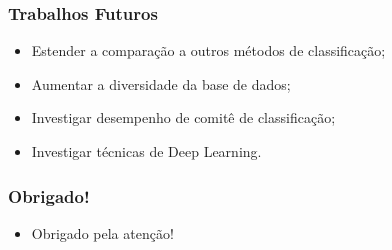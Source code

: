\documentclass{beamer}
\begin{document}
\begin{frame}

	\frametitle{Trabalhos Futuros}
	
	\begin{itemize}
		\setlength\itemsep{1em}
		
		\item Estender a comparação a outros métodos de classificação;
        \item Aumentar a diversidade da base de dados;
		\item Investigar desempenho de comitê de classificação;
        \item Investigar técnicas de Deep Learning.
	
	\end{itemize}


\end{frame}


\begin{frame}
	\frametitle{Obrigado!}
    
    \centering
    
    \begin{itemize}
    	\setlength\itemsep{2em}
		\item Obrigado pela atenção!
	\end{itemize}

\end{frame}
\end{document}
